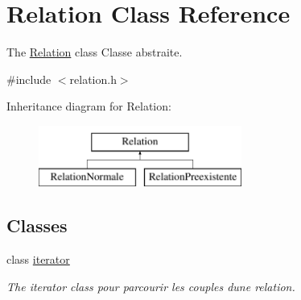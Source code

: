 \hypertarget{class_relation}{}\section{Relation Class Reference}
\label{class_relation}


The \hyperlink{class_relation}{Relation} class Classe abstraite.  




{\ttfamily \#include $<$relation.\+h$>$}

Inheritance diagram for Relation\+:\begin{figure}[H]
\begin{center}
\leavevmode
\includegraphics[height=2.000000cm]{class_relation}
\end{center}
\end{figure}
\subsection*{Classes}
\begin{DoxyCompactItemize}
\item 
class \hyperlink{class_relation_1_1iterator}{iterator}
\begin{DoxyCompactList}\small\item\em The iterator class pour parcourir les couples d\textquotesingle{}une relation. \end{DoxyCompactList}\end{DoxyCompactItemize}
